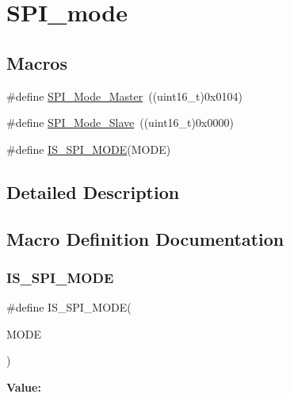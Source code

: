 \hypertarget{group___s_p_i__mode}{}\section{S\+P\+I\+\_\+mode}
\label{group___s_p_i__mode}
\subsection*{Macros}
\begin{DoxyCompactItemize}
\item 
\#define \mbox{\hyperlink{group___s_p_i__mode_gaa9e47fb7c1d6c4655b72a00ed1f3b651}{S\+P\+I\+\_\+\+Mode\+\_\+\+Master}}~((uint16\+\_\+t)0x0104)
\item 
\#define \mbox{\hyperlink{group___s_p_i__mode_ga84621141413ee07cb2d2dc82da2baa42}{S\+P\+I\+\_\+\+Mode\+\_\+\+Slave}}~((uint16\+\_\+t)0x0000)
\item 
\#define \mbox{\hyperlink{group___s_p_i__mode_gad5135300763c75dbb446861536359f12}{I\+S\+\_\+\+S\+P\+I\+\_\+\+M\+O\+DE}}(M\+O\+DE)
\end{DoxyCompactItemize}


\subsection{Detailed Description}


\subsection{Macro Definition Documentation}
\mbox{\label{group___s_p_i__mode_gad5135300763c75dbb446861536359f12}} 
\subsubsection{\texorpdfstring{IS\_SPI\_MODE}{IS\_SPI\_MODE}}
{\footnotesize\ttfamily \#define I\+S\+\_\+\+S\+P\+I\+\_\+\+M\+O\+DE(\begin{DoxyParamCaption}\item[{}]{M\+O\+DE }\end{DoxyParamCaption})}

{\bfseries Value\+:}
\begin{DoxyCode}{0}

\end{DoxyCode}
\mbox{\label{group___s_p_i__mode_gaa9e47fb7c1d6c4655b72a00ed1f3b651}} 
